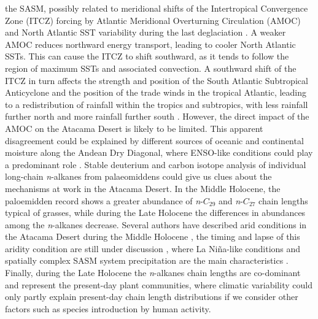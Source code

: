 \documentclass[
  authoryear,
  preprint,
  3p]{elsarticle}
\begin{document}
the SASM, possibly related to meridional shifts of the Intertropical
Convergence Zone (ITCZ) forcing by Atlantic Meridional Overturning
Circulation (AMOC) and North Atlantic SST variability during the last
deglaciation \citep[see Figure~\ref{fig-5}
j]{fornace60000yearRecord2014a}. A weaker AMOC reduces northward energy
transport, leading to cooler North Atlantic SSTs. This can cause the
ITCZ to shift southward, as it tends to follow the region of maximum
SSTs and associated convection. A southward shift of the ITCZ in turn
affects the strength and position of the South Atlantic Subtropical
Anticyclone and the position of the trade winds in the tropical
Atlantic, leading to a redistribution of rainfall within the tropics and
subtropics, with less rainfall further north and more rainfall further
south
\citep{schneiderMigrationsDynamicsIntertropical2014a, houstonRoleNonstationaryAndean2022}.
However, the direct impact of the AMOC on the Atacama Desert is likely
to be limited. This apparent disagreement could be explained by
different sources of oceanic and continental moisture along the Andean
Dry Diagonal, where ENSO-like conditions could play a predominant role
\citep[see][]{houstonRoleNonstationaryAndean2022}. Stable deuterium and
carbon isotope analysis of individual long-chain \emph{n}-alkanes from
palaeomiddens could give us clues about the mechanisms at work in the
Atacama Desert. In the Middle Holocene, the paloemidden record shows a
greater abundance of \emph{n}-\(C_{29}\) and \emph{n}-\(C_{27}\) chain
lengths typical of grasses, while during the Late Holocene the
differences in abundances among the \emph{n}-alkanes decrease. Several
authors have described arid conditions in the Atacama Desert during the
Middle Holocene
\citep{grosjeanLateglacialEarlyMiddle1994, valero-garcesLimnogeologyLagunaMiscanti1996, betancourt22000YearRecord2000, nunezHumanOccupationsClimate2002a},
the timing and lapse of this aridity condition are still under
discussion
\citep{grosjeanMidHoloceneClimateSouthCentral2001, latorreVegetationInvasionsAbsolute2002, rechLateQuaternaryPaleohydrology2002},
where La Niña-like conditions and spatially complex SASM system
precipitation are the main characteristics
\citep{reinNinoVariabilityPeru2005, wongVariationsSouthAtlantic2021}.
Finally, during the Late Holocene the \emph{n}-alkanes chain lengths are
co-dominant and represent the present-day plant communities, where
climatic variability could only partly explain present-day chain length
distributions if we consider other factors such as species introduction
by human activity.
\end{document}
